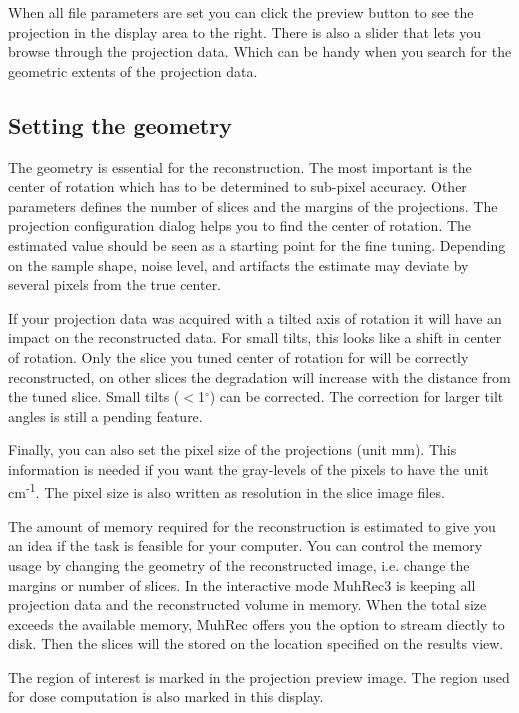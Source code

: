 \documentclass[a4paper]{scrreprt}
\begin{document}
When all file parameters are set you can click the preview button to see the projection in the display area to the right. There is also a slider that lets you browse through the projection data. Which can be handy when you search for the geometric extents of the projection data.

\subsection{Setting the geometry}
The geometry is essential for the reconstruction. The most important is the center of rotation which has to be determined to sub-pixel accuracy. Other parameters defines the number of slices and the margins of the projections. The projection configuration dialog helps you to find the center of rotation. The estimated value should be seen as a starting point for the fine tuning. Depending on the sample shape, noise level, and artifacts the estimate may deviate by several pixels from the true center. 

If your projection data was acquired with a tilted axis of rotation it will have an impact on the reconstructed data. For small tilts, this looks like a shift in center of rotation. Only the slice you tuned center of rotation for will be correctly reconstructed, on other slices the degradation will increase with the distance from the tuned slice. 
Small tilts ($<$1$^{\circ}$) can be corrected. The correction for larger tilt angles is still a pending feature.

Finally, you can also set the pixel size of the projections (unit mm). This information is needed if you want the gray-levels of the pixels to have the unit cm\textsuperscript{-1}. The pixel size is also written as resolution in the slice image files.

The amount of memory required for the reconstruction is estimated to give you an idea if the task is feasible for your computer. You can control the memory usage by changing the geometry of the reconstructed image, i.e. change the margins or number of slices. In the interactive mode MuhRec3 is keeping all projection data and the reconstructed volume in memory. When the total size exceeds the available memory, MuhRec offers you the option to stream diectly to disk. Then the slices will the stored on the location specified on the results view.


The region of interest is marked in the projection preview image. The region used for dose computation is also marked in this display.
\end{document}
